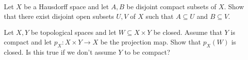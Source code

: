 \documentclass[answers]{exam}
\begin{document}
\begin{questions}



\question%
Let $X$ be a Hausdorff space and let $A, B$ be disjoint compact subsets of $X$. Show that there exist disjoint open subsets $U, V$ of $X$ such that $A \subseteq U$ and $B \subseteq V$.



\question%
Let $X, Y$ be topological spaces and let $W \subseteq X \times Y$ be closed. Assume that $Y$ is compact and let $p_{X}: X \times Y \to X$ be the projection map. Show that $p_{X}(W)$ is closed. Is this true if we don't assume $Y$ to be compact?

\end{questions}
\end{document}
